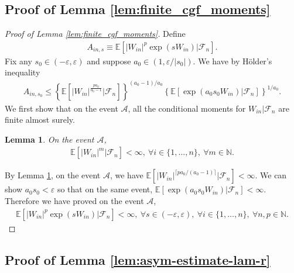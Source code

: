 \documentclass[12pt]{article}
\newtheorem{lemma}{Lemma}
\theoremstyle{definition}
\newcommand{\E}{\mathbb E}								%
\begin{document}
\subsection{Proof of Lemma \ref{lem:finite_cgf_moments}}\label{sec:proof_finite_cgf_moments}


\begin{proof}[Proof of Lemma \ref{lem:finite_cgf_moments}]
	Define 
	\begin{align*}
		A_{in,s}\equiv \E[|W_{in}|^p\exp(sW_{in})|\mathcal{F}_n].
	\end{align*}
	Fix any $s_0\in (-\varepsilon,\varepsilon)$ and suppose $a_0\in (1, \varepsilon/|s_0|)$. We have by H\"older's inequality
	\begin{align*}
		A_{in,s_0}\leq \left\{\E\left[|W_{in}|^{\frac{pa_0}{a_0-1}}|\mathcal{F}_n\right]\right\}^{(a_0-1)/a_0}\left\{\E\left[\exp\left(a_0s_0W_{in}\right)|\mathcal{F}_n\right]\right\}^{1/a_0}.
	\end{align*}
	We first show that on the event $\mathcal{A}$, all the conditional moments for $W_{in}|\mathcal{F}_n$ are finite almost surely.
	\begin{lemma}\label{lem:finite_moment}
		On the event $\mathcal{A}$, 
		\begin{align*}
			\E[|W_{in}|^m|\mathcal{F}_n]<\infty,\ \forall i\in \{1,\ldots,n\},\ \forall m\in\mathbb{N}.
		\end{align*}
	\end{lemma}
	\noindent By Lemma \ref{lem:finite_moment}, on the event $\mathcal{A}$, we have $\E\left[|W_{in}|^{\lceil pa_0 / (a_0-1)\rceil}|\mathcal{F}_n\right]<\infty$. We can show $a_0s_0<\varepsilon$ so that on the same event, $\E\left[\exp\left(a_0s_0W_{in}\right)|\mathcal{F}_n\right]<\infty$.
	Therefore we have proved on the event $\mathcal{A}$,
	\begin{align*}
		\E[|W_{in}|^p\exp(sW_{in})|\mathcal{F}_n]<\infty,\ \forall s\in (-\varepsilon,\varepsilon),\ \forall i\in\{1,\ldots,n\},\ \forall n,p\in \mathbb{N}.
	\end{align*}
\end{proof}



	
\subsection{Proof of Lemma \ref{lem:asym-estimate-lam-r}}
\end{document}
